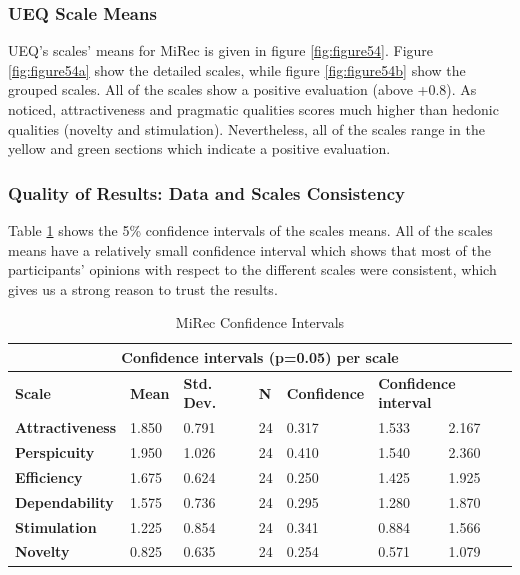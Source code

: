 \subsubsection{UEQ Scale Means}
UEQ's scales' means for MiRec is given in figure \ref{fig:figure54}. Figure
\ref{fig:figure54a} show the detailed scales, while figure \ref{fig:figure54b}
show the grouped scales. All of the scales show a positive evaluation (above
+0.8). As noticed, attractiveness and pragmatic qualities scores much higher
than hedonic qualities (novelty and stimulation). Nevertheless, all of the scales range in
the yellow and green sections which indicate a positive evaluation.
\subsubsection{Quality of Results: Data and Scales Consistency}
Table \ref{table:table55} shows the 5\% confidence intervals of
the scales means. All of the scales means have a relatively small confidence
interval which shows that most of the participants' opinions with respect to
the different scales were consistent, which gives us a strong reason to trust
the results.
\begin{table}[!htbp]
\tiny 
\centering
\begin{tabular}{|l|l|l|l|l|l|l|}
\hline
\multicolumn{7}{|c|}{\textbf{Confidence intervals (p=0.05) per scale}}                                                                              \\ \hline
\textbf{Scale}          & \textbf{Mean} & \textbf{Std. Dev.} & \textbf{N} & \textbf{Confidence} & \multicolumn{2}{l|}{\textbf{Confidence interval}} \\ \hline
\textbf{Attractiveness} & 1.850         & 0.791              & 24         & 0.317               & 1.533                   & 2.167                   \\ \hline
\textbf{Perspicuity}    & 1.950         & 1.026              & 24         & 0.410               & 1.540                   & 2.360                   \\ \hline
\textbf{Efficiency}     & 1.675         & 0.624              & 24         & 0.250               & 1.425                   & 1.925                   \\ \hline
\textbf{Dependability}  & 1.575         & 0.736              & 24         & 0.295               & 1.280                   & 1.870                   \\ \hline
\textbf{Stimulation}    & 1.225         & 0.854              & 24         & 0.341               & 0.884                   & 1.566                   \\ \hline
\textbf{Novelty}        & 0.825         & 0.635              & 24         & 0.254               & 0.571                   & 1.079                   \\ \hline
\end{tabular}
\caption{MiRec Confidence Intervals}
\label{table:table55}
\end{table}
